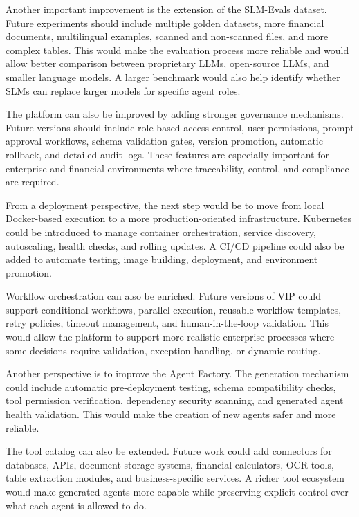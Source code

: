 Another important improvement is the extension of the SLM-Evals dataset. Future experiments should include multiple golden datasets, more financial documents, multilingual examples, scanned and non-scanned files, and more complex tables. This would make the evaluation process more reliable and would allow better comparison between proprietary LLMs, open-source LLMs, and smaller language models. A larger benchmark would also help identify whether SLMs can replace larger models for specific agent roles.

The platform can also be improved by adding stronger governance mechanisms. Future versions should include role-based access control, user permissions, prompt approval workflows, schema validation gates, version promotion, automatic rollback, and detailed audit logs. These features are especially important for enterprise and financial environments where traceability, control, and compliance are required.

From a deployment perspective, the next step would be to move from local Docker-based execution to a more production-oriented infrastructure. Kubernetes could be introduced to manage container orchestration, service discovery, autoscaling, health checks, and rolling updates. A CI/CD pipeline could also be added to automate testing, image building, deployment, and environment promotion.

Workflow orchestration can also be enriched. Future versions of VIP could support conditional workflows, parallel execution, reusable workflow templates, retry policies, timeout management, and human-in-the-loop validation. This would allow the platform to support more realistic enterprise processes where some decisions require validation, exception handling, or dynamic routing.

Another perspective is to improve the Agent Factory. The generation mechanism could include automatic pre-deployment testing, schema compatibility checks, tool permission verification, dependency security scanning, and generated agent health validation. This would make the creation of new agents safer and more reliable.

The tool catalog can also be extended. Future work could add connectors for databases, APIs, document storage systems, financial calculators, OCR tools, table extraction modules, and business-specific services. A richer tool ecosystem would make generated agents more capable while preserving explicit control over what each agent is allowed to do.

